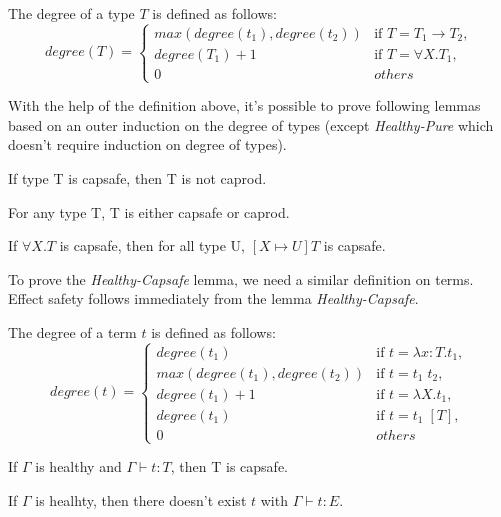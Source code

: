 \begin{definition}
  The degree of a type $T$ is defined as follows:
  \begin{equation*}
    degree(T) =
    \begin{cases}
      max(degree(t_1), degree(t_2)) & \text{if } T = T_1 \to T_2,\\
      degree(T_1) + 1 & \text{if } T = \forall X.T_1,\\
      0 & others
    \end{cases}
  \end{equation*}
\end{definition}

With the help of the definition above, it's possible to prove
following lemmas based on an outer induction on the degree of types
(except \emph{Healthy-Pure} which doesn't require induction on degree
of types).

\begin{lemma}
 If type T is capsafe, then T is not caprod.
\end{lemma}

\begin{lemma}
 For any type T, T is either capsafe or caprod.
\end{lemma}


\begin{lemma}
  If $\forall X.T$ is capsafe, then for all type U, $[X \mapsto U]T$
  is capsafe.
\end{lemma}

To prove the \emph{Healthy-Capsafe} lemma, we need a similar
definition on terms. Effect safety follows immediately from the lemma
\emph{Healthy-Capsafe}.

\begin{definition}
  The degree of a term $t$ is defined as follows:
  \begin{equation*}
    degree(t) =
    \begin{cases}
      degree(t_1) & \text{if } t = \lambda x:T.t_1,\\
      max(degree(t_1), degree(t_2)) & \text{if } t = t_1 \; t_2,\\
      degree(t_1) + 1 & \text{if } t = \lambda X.t_1,\\
      degree(t_1) & \text{if } t = t_1 \; [T],\\
      0 & others
    \end{cases}
  \end{equation*}
\end{definition}

\begin{lemma}
  If $\Gamma$ is healthy and $\Gamma \vdash t : T$, then T is capsafe.
\end{lemma}

\begin{theorem}
  If $\Gamma$ is healhty, then there doesn't exist $t$ with
  $\Gamma \vdash t : E$.
\end{theorem}
